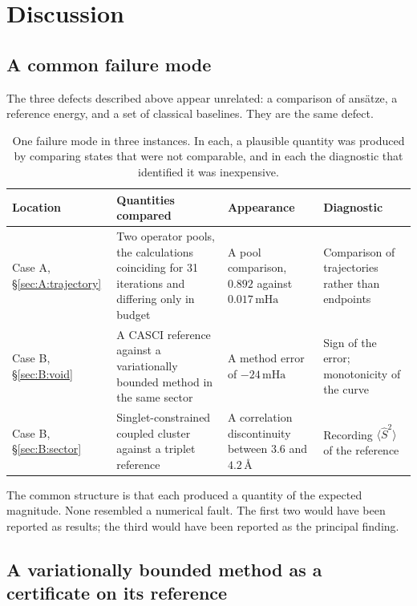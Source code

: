 \documentclass[11pt,a4paper]{article}
\newcommand{\mHa}{\ensuremath{\,\mathrm{mHa}}}
\newcommand{\Ang}{\ensuremath{\,\text{\AA}}}
\newcommand{\Ssq}{\ensuremath{\langle \hat{S}^2 \rangle}}
\begin{document}
\section{Discussion}
\label{sec:discussion}

\subsection{A common failure mode}

The three defects described above appear unrelated: a comparison of ansätze, a
reference energy, and a set of classical baselines. They are the same defect.

\begin{table}[htbp]
\centering
\small
\caption{One failure mode in three instances. In each, a plausible quantity was
produced by comparing states that were not comparable, and in each the
diagnostic that identified it was inexpensive.}
\label{tab:S:three}
\begin{tabular}{@{}p{2.7cm}p{4.4cm}p{3.2cm}p{3.4cm}@{}}
\toprule
Location & Quantities compared & Appearance & Diagnostic \\
\midrule
Case A,
\S\ref{sec:A:trajectory} &
Two operator pools, the calculations coinciding for 31 iterations and differing
only in budget &
A pool comparison, $0.892$ against $0.017\mHa$ &
Comparison of trajectories rather than endpoints \\[4pt]
Case B,
\S\ref{sec:B:void} &
A CASCI reference against a variationally bounded method in the same sector &
A method error of $-24\mHa$ &
Sign of the error; monotonicity of the curve \\[4pt]
Case B,
\S\ref{sec:B:sector} &
Singlet-constrained coupled cluster against a triplet reference &
A correlation discontinuity between $3.6$ and $4.2\Ang$ &
Recording $\Ssq$ of the reference \\
\bottomrule
\end{tabular}
\end{table}

The common structure is that each produced a quantity of the expected
magnitude. None resembled a numerical fault. The first two would have been
reported as results; the third would have been reported as the principal
finding.

\subsection{A variationally bounded method as a certificate on its reference}
\label{sec:discussion:certificate}
\end{document}
